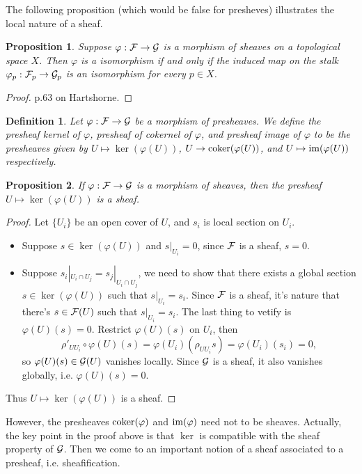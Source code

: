 \documentclass[9pt]{extarticle}
\theoremstyle{plain}
\newtheorem{pro}{Proposition}
\newtheorem{defi}{Definition}
\begin{document}
The following proposition (which would be false for presheves) illustrates the local nature of a sheaf.
\begin{pro}
	Suppose $\varphi:\mathcal{F}\to\mathcal{G}$ is a morphism of sheaves on a topological space $X$. Then $\varphi$ is a isomorphism if and only if the induced map on the stalk $\varphi_p:\mathcal{F}_p\to \mathcal{G}_p$ is an isomorphism for every $p\in X$.
	\label{pro:1}
\end{pro}
\begin{proof}
	p.63 on Hartshorne.
\end{proof}
\begin{defi}
	Let $\varphi:\mathcal{F}\to\mathcal{G}$ be a morphism of presheaves. We define the presheaf kernel of $\varphi$, presheaf of cokernel of $\varphi$, and presheaf image of $\varphi$ to be the presheaves given by $U\mapsto \ker(\varphi(U))$, $U\to \operatorname{coker}(\varphi(U))$, and $U\mapsto \operatorname{im}(\varphi(U))$ respectively.
\end{defi}
\begin{pro}
If $\varphi:\mathcal{F}\to\mathcal{G}$ is a morphism of sheaves, then the presheaf $U\mapsto \ker(\varphi(U))$ is a sheaf.
\end{pro}
\begin{proof}
	Let $\{U_i\}$ be an open cover of $U$, and $s_i$ is local section on $U_i$. 

	\begin{itemize}
		\item Suppose $s\in \ker(\varphi(U))$ and $s|_{U_i}=0$, since $\mathcal{F}$ is a sheaf, $s=0$.

		\item Suppose $s_i|_{U_i\cap U_j}=s_j|_{U_i\cap U_j}$, we need to show that there exists a global section $s\in \ker(\varphi(U))$ such that $s|_{U_i}=s_i$. Since $\mathcal{F}$ is a sheaf, it's nature that there's $s\in \mathcal{F}(U)$ such that $s|_{U_i}=s_i$. The last thing to vetify is $\varphi(U)(s)=0$. Restrict $\varphi(U)(s)$ on $U_i$, then
		\[
			\rho'_{UU_i}\circ \varphi(U)(s)=\varphi(U_i)(\rho_{UU_i}s)=\varphi(U_i)(s_i)=0,
		\]
		so $\varphi(U)(s)\in \mathcal{G}(U)$ vanishes locally. Since $\mathcal{G}$ is a sheaf, it also 	vanishes globally, i.e. $\varphi(U)(s)=0$.
	\end{itemize}
	Thus $U\mapsto \ker(\varphi(U))$ is a sheaf.
\end{proof}
However, the presheaves $\operatorname{coker}(\varphi)$ and $\operatorname{im}(\varphi)$ need not to be sheaves. Actually, the key point in the proof above is that $\ker$ is compatible with the sheaf property of $\mathcal{G}$. Then we come to an important notion of a sheaf associated to a presheaf, i.e. sheafification.
\end{document}
